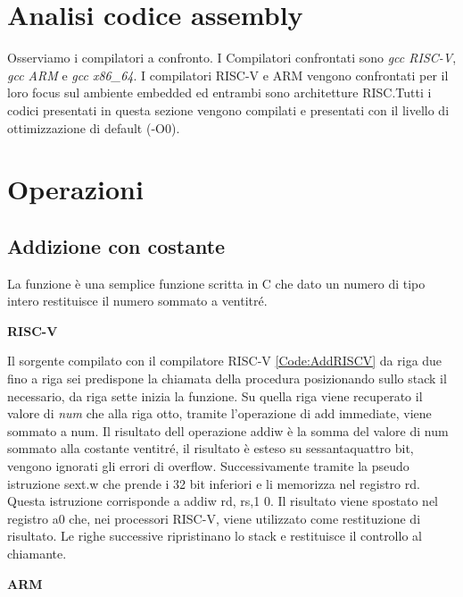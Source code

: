 \documentclass[12pt,a4paper]{report}
\begin{document}
	
\section{Analisi codice assembly}
Osserviamo i compilatori a confronto.  I Compilatori confrontati sono \textit{gcc RISC-V},  \textit{gcc ARM} e \textit{gcc x86\_64}.  I compilatori RISC-V e ARM vengono confrontati per il loro focus sul ambiente embedded ed entrambi sono architetture RISC.Tutti i codici presentati in questa sezione vengono compilati e presentati con il livello di ottimizzazione di default (-O0).


\section{Operazioni}
\subsection{Addizione con costante}



La funzione è una semplice funzione scritta in C che dato un numero di tipo intero restituisce il numero sommato a ventitré. 

\vspace{0.3 cm}
\textbf{RISC-V}

\vspace{0.3 cm}
Il sorgente compilato con il compilatore RISC-V \ref{Code:AddRISCV} da riga due fino a riga sei predispone la chiamata della procedura posizionando sullo stack il necessario, da riga sette inizia la funzione. Su quella riga viene recuperato il valore di \textit{num} che alla riga otto, tramite l'operazione di add immediate, viene sommato a num. Il risultato dell operazione addiw è la somma del valore di num sommato alla costante ventitré, il risultato è esteso su sessantaquattro bit, vengono ignorati gli errori di overflow. Successivamente tramite la pseudo istruzione sext.w che prende i 32 bit inferiori e li memorizza nel registro rd.  Questa istruzione corrisponde a addiw rd, rs,1 0. Il risultato viene spostato nel registro a0 che, nei processori RISC-V, viene utilizzato come restituzione di risultato. Le righe successive ripristinano lo stack e restituisce il controllo al chiamante.

\vspace{0.3 cm}
\textbf{ARM}
\end{document}
